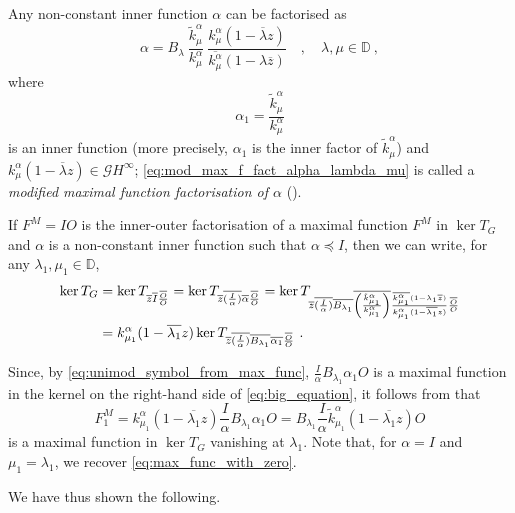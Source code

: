 \documentclass{article}
\numberwithin{equation}{section}
\theoremstyle{plain}
\newcommand{\Hinf}{\ensuremath{H^\infty}}
\newcommand{\DD}{\ensuremath{\mathbb{D}}}
\newcommand{\GG}{\ensuremath{\mathcal{G}}}
\newcommand{\ol}[1]{\ensuremath{\overline{#1}}}
\begin{document}
Any non-constant inner function $\alpha$ can be factorised as
\begin{equation}
\label{eq:mod_max_f_fact_alpha_lambda_mu}
\alpha = B_\lambda\ \frac{\tilde k^\alpha_\mu}{k^\alpha_\mu}\ \frac{k^\alpha_\mu (1-\ol\lambda z)}{\ol{k^\alpha_\mu} (1-\lambda\ol z)} \quad, \quad \lambda,\mu\in\DD\ ,
\end{equation}
where
\begin{equation}
\alpha_1 = \frac{\tilde k^\alpha_\mu}{k^\alpha_\mu}
\end{equation}
is an inner function (more precisely, $\alpha_1$ is the inner factor of $\tilde k^\alpha_\mu$) and $k^\alpha_\mu (1-\ol\lambda z) \in \GG\Hinf$;
\eqref{eq:mod_max_f_fact_alpha_lambda_mu} is called a {\em modified maximal function factorisation of $\alpha$} (\cite{CCD25}).


If $F^M = IO$ is the inner-outer factorisation of a maximal function $F^M$ in $\ker T_G$ and $\alpha$ is a non-constant inner function such that $\alpha \preceq I$, then we can write, for any $\lambda_1,\mu_1\in\DD$,
\begin{align}
\ker T_G & = \ker T_{\ol z \ol I \frac{\ol O}{O}} = \ker T_{\ol z \ol{(\frac{I}{\alpha})} \ol\alpha \frac{\ol O}{O}} = 
\ker T_{
\ol z \ol{(\frac{I}{\alpha})} \ol{B_{\lambda_1}} \ol{\left(
\frac{\tilde k^\alpha_{\mu_1}}{k^\alpha_{\mu_1}}
\right)} \frac{\ol{k^\alpha_{\mu_1}} (1-{\lambda_1} \ol z)}{k^\alpha_{\mu_1} (1-\ol{\lambda_1} z)} \frac{\ol O}{O}
} \notag \\
 & = k^\alpha_{\mu_1} (1-\ol{\lambda_1} z) \ker T_{ \ol z \ol{(\frac{I}{\alpha})} \ol{B_{\lambda_1}} \ol{\alpha_1} \frac{\ol O}{O} }\ .
\label{eq:big_equation}
\end{align}


Since, by \eqref{eq:unimod_symbol_from_max_func}, $\frac{I}{\alpha} B_{\lambda_1} \alpha_1 O$ is a maximal function in the kernel on the right-hand side of \eqref{eq:big_equation}, it follows from \cite[Theorem 3.2]{CP18_multipliers} that
\begin{equation}
\label{eq:big_family_max_f}
F^M_1 = k^\alpha_{\mu_1} (1-\ol{\lambda_1} z) \frac{I}{\alpha} B_{\lambda_1} \alpha_1 O = B_{\lambda_1} \frac{I}{\alpha} \tilde k^\alpha_{\mu_1} (1-\ol{\lambda_1} z) O
\end{equation}
is a maximal function in $\ker T_G$ vanishing at $\lambda_1$.
Note that, for $\alpha = I$ and $\mu_1 = \lambda_1$, we recover \eqref{eq:max_func_with_zero}.

We have thus shown the following.
\end{document}
